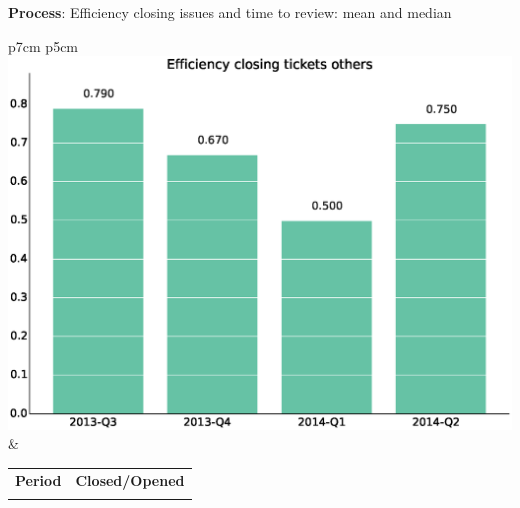 \documentclass[a4wide,11pt]{report}
\begin{document}
\textbf{Process}: Efficiency closing issues and time to review: mean and median

\begin{tabular}{p{7cm} p{5cm}}
    \vspace{0pt} 
    \includegraphics[scale=.35]{figs/bmiothers.eps}
    & 
    \vspace{0pt}
    \begin{tabular}{l|l}%
    \bfseries Period & \bfseries Closed/Opened %
    \csvreader[head to column names]{data/bmiothers.csv}{}%
    {\\ & \bmi}
    \end{tabular}
\end{tabular}
\end{document}
